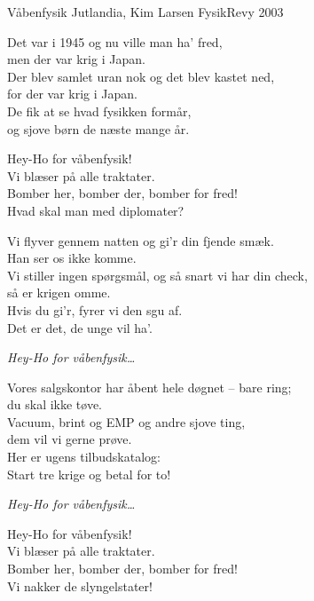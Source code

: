 \begin{song}{Våbenfysik}{}
  {Jutlandia, Kim Larsen}
  {}
  {FysikRevy 2003}
  {\NotCCLIed}

  \begin{SBVerse}
	Det var i 1945 og nu ville man ha’ fred,\\
	men der var krig i Japan.\\
	Der blev samlet uran nok og det blev kastet ned,\\
	for der var krig i Japan.\\
	De fik at se hvad fysikken formår,\\
	og sjove børn de næste mange år.
  \end{SBVerse}

  \begin{SBChorus}
	Hey-Ho for våbenfysik!\\
	Vi blæser på alle traktater.\\
	Bomber her, bomber der, bomber for fred!\\
	Hvad skal man med diplomater?
  \end{SBChorus}

  \begin{SBVerse}
	Vi flyver gennem natten og gi’r din fjende smæk.\\
	Han ser os ikke komme.\\
	Vi stiller ingen spørgsmål, og så snart vi har din check,\\
	så er krigen omme.\\
	Hvis du gi’r, fyrer vi den sgu af.\\
	Det er det, de unge vil ha’.
  \end{SBVerse}

  \begin{SBChorus}
   	\textit{Hey-Ho for våbenfysik\ldots}
  \end{SBChorus}

  \begin{SBVerse}
	Vores salgskontor har åbent hele døgnet – bare ring;\\
	du skal ikke tøve.\\
	Vacuum, brint og EMP og andre sjove ting,\\
	dem vil vi gerne prøve.\\
	Her er ugens tilbudskatalog:\\
	Start tre krige og betal for to!
  \end{SBVerse}

  \begin{SBChorus}
	\textit{Hey-Ho for våbenfysik\ldots}
  \end{SBChorus}
  
  \begin{SBChorus}
	Hey-Ho for våbenfysik!\\
	Vi blæser på alle traktater.\\
	Bomber her, bomber der, bomber for fred!\\
	Vi nakker de slyngelstater!
  \end{SBChorus}

\end{song}